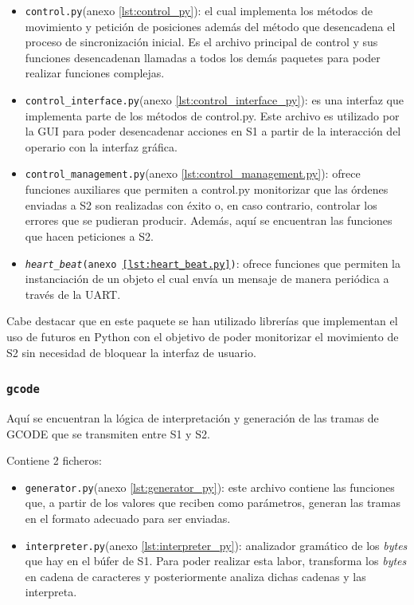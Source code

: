 \begin{itemize}
    \item \texttt{control.py}(anexo \ref{lst:control_py}): el cual implementa los métodos de movimiento y petición de posiciones además del método que desencadena el proceso de sincronización inicial. Es el archivo principal de control y sus funciones desencadenan llamadas a todos los demás paquetes para poder realizar funciones complejas.
    \item \texttt{control\_interface.py}(anexo \ref{lst:control_interface_py}): es una interfaz que implementa parte de los métodos de control.py. Este archivo es utilizado por la GUI para poder desencadenar acciones en \ac{S1} a partir de la interacción del operario con la interfaz gráfica.
    \item \texttt{control\_management.py}(anexo \ref{lst:control_management.py}): ofrece funciones auxiliares que permiten a control.py monitorizar que las órdenes enviadas a \ac{S2} son realizadas con éxito o, en caso contrario, controlar los errores que se pudieran producir.
    Además, aquí se encuentran las funciones que hacen peticiones a \ac{S2}.
    \item \texttt{\textit{heart\_beat}(anexo \ref{lst:heart_beat.py})}: ofrece funciones que permiten la instanciación de un objeto el cual envía un mensaje de manera periódica a través de la UART.
\end{itemize}

Cabe destacar que en este paquete se han utilizado librerías  que implementan el uso de futuros en Python con el objetivo de poder monitorizar el movimiento de \ac{S2} sin necesidad de bloquear la interfaz de usuario.

\subsubsection{\texttt{gcode}}

Aquí se encuentran la lógica de interpretación y generación de las tramas de GCODE que se transmiten entre \ac{S1} y \ac{S2}.

Contiene 2 ficheros:

\begin{itemize}
    \item \texttt{generator.py}(anexo \ref{lst:generator_py}): este archivo contiene las funciones que, a partir de los valores que reciben como parámetros, generan las tramas en el formato adecuado para ser enviadas.
    
    \item \texttt{interpreter.py}(anexo \ref{lst:interpreter_py}): analizador gramático de los \textit{bytes} que hay en el búfer de \ac{S1}.
    Para poder realizar esta labor, transforma los \textit{bytes} en cadena de caracteres y posteriormente analiza dichas cadenas y las interpreta.
\end{itemize}

